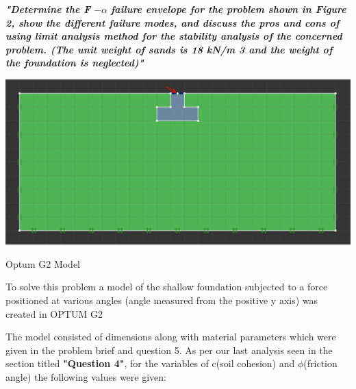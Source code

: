 \documentclass{article}
\begin{document}
\label{H_8EA8D249}

\begin{par}
\begin{flushleft}
\textit{\textbf{"Determine the F }}$-\alpha$\textit{\textbf{ failure envelope for the problem shown in Figure 2, show the different failure modes, and discuss the pros and cons of using limit analysis method for the stability analysis of the concerned problem. (The unit weight of sands is 18 kN/m 3 and the weight of the foundation is neglected)"  }}
\end{flushleft}
\end{par}

\vspace{1.1mm}

\begin{par}
\begin{center}
\includegraphics[width=15cm]{image_2}
\end{center}
\end{par}

\begin{par}
\begin{center}
Optum G2 Model
\end{center}
\end{par}

\begin{par}
\begin{flushleft}
To solve this problem a model of the shallow foundation subjected to a force positioned at various angles (angle measured from the positive y axis) was created in OPTUM G2
\end{flushleft}
\end{par}

\begin{par}
\begin{flushleft}
The model consisted of dimensions along with material parameters which were given in the problem brief and question 5. As per our last analysis seen in the section titled \textbf{"Question 4"}, for the variables of c(soil cohesion) and $\phi$(friction angle) the following values were given:
\end{flushleft}
\end{par}
\end{document}
